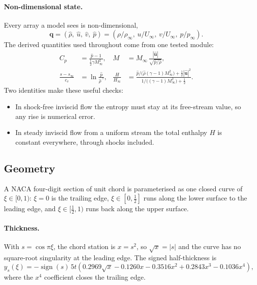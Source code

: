 \documentclass[11pt]{article}
\newcommand{\Ma}{M_\infty}
\newcommand{\Cp}{C_p}
\newcommand{\vu}{\bm{u}}
\begin{document}
\paragraph{Non-dimensional state.}
Every array a model sees is non-dimensional,
\begin{equation}
  \bm q = (\hat\rho,\ \hat u,\ \hat v,\ \hat p) = (\rho/\rho_\infty,\ u/U_\infty,\ v/U_\infty,\ p/p_\infty).
\end{equation}
The derived quantities used throughout come from one tested module:
\begin{align}
  \Cp &= \frac{\hat p - 1}{\tfrac12\gamma\Ma^2}, &
  M &= \Ma\,\frac{|\hat{\vu}|}{\sqrt{\hat p/\hat\rho}}, \label{eq:cp}\\
  \frac{s - s_\infty}{c_v} &= \ln\frac{\hat p}{\hat\rho^{\,\gamma}}, &
  \frac{H}{H_\infty} &= \frac{\hat p/\bigl(\hat\rho(\gamma-1)\Ma^2\bigr) + \tfrac12|\hat{\vu}|^2}
                            {1/\bigl((\gamma-1)\Ma^2\bigr) + \tfrac12}. \label{eq:entropy}
\end{align}
Two identities make these useful checks:
\begin{itemize}
  \item In shock-free inviscid flow the entropy must stay at its free-stream value, so any rise is
    numerical error.
  \item In steady inviscid flow from a uniform stream the total enthalpy $H$ is constant
    everywhere, through shocks included.
\end{itemize}

\subsection{Geometry}

A NACA four-digit section of unit chord is parameterised as one closed curve of $\xi\in[0,1)$:
$\xi = 0$ is the trailing edge, $\xi\in[0,\tfrac12]$ runs along the lower surface to the leading
edge, and $\xi\in[\tfrac12,1)$ runs back along the upper surface.

\paragraph{Thickness.}
With $s = \cos\pi\xi$, the chord station is $x = s^2$, so $\sqrt{x} = |s|$ and the curve has no
square-root singularity at the leading edge. The signed half-thickness is
\begin{equation}
  y_s(\xi) = -\operatorname{sign}(s)\,5t\left(0.2969\sqrt{x} - 0.1260x - 0.3516x^2 + 0.2843x^3 - 0.1036x^4\right),
  \label{eq:naca}
\end{equation}
where the $x^4$ coefficient closes the trailing edge.
\end{document}
